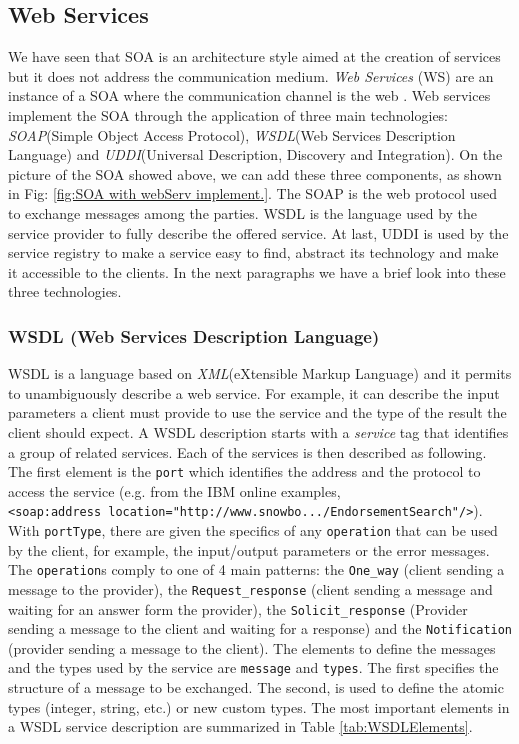 \subsection{Web Services}
\label{WebServices}
We have seen that SOA is an architecture style aimed at the creation of services but it does not address the communication medium. \textit{Web Services} (WS) are an instance of a SOA where the communication channel is the web \cite{Pernici04}.
Web services implement the SOA through the application of three main technologies: \textit{SOAP}(Simple Object Access Protocol), \textit{WSDL}(Web Services Description Language) and \textit{UDDI}(Universal Description, Discovery and Integration).
On the picture of the SOA showed above, we can add these three components, as shown in Fig: \ref{fig:SOA with webServ implement.}. The SOAP is the web protocol used to exchange messages among the parties. WSDL is the language used by the service provider to fully describe the offered service. At last, UDDI is used by the service registry to make a service easy to find, abstract its technology and make it accessible to the clients.
In the next paragraphs we have a brief look into these three technologies.

\subsubsection{WSDL (Web Services Description Language) }
\label{Wsdl}
WSDL is a language based on \textit{XML}(eXtensible Markup Language) and it permits to unambiguously describe a web service. For example, it can describe the input parameters a client must provide to use the service and the type of the result the client should expect. 
A WSDL description starts with a \textit{service} tag that identifies a group of related services. Each of the services is then described as following.
The first element is the \verb|port| which identifies the address and the protocol to access the service (e.g. from the IBM online examples,\cite{IBMWSDL} \\
\verb|<soap:address location="http://www.snowbo.../EndorsementSearch"/>|). \\
With \verb|portType|, there are given the specifics of any \verb|operation| that can be used by the client, for example, the input/output parameters or the error messages. The \verb|operation|s comply to one of 4 main patterns: the \verb|One_way| (client sending a message to the provider), the \verb|Request_response| (client sending a message and waiting for an answer form the provider), the \verb|Solicit_response| (Provider sending a message to the client and waiting for a response) and the \verb|Notification| (provider sending a message to the client).
The elements to define the messages and the types used by the service are \verb|message| and \verb|types|. The first specifies the structure of a message to be exchanged. The second, is used to define the atomic types (integer, string, etc.) or new custom types. 
The most important elements in a WSDL service description are summarized in Table \ref{tab:WSDLElements}.


